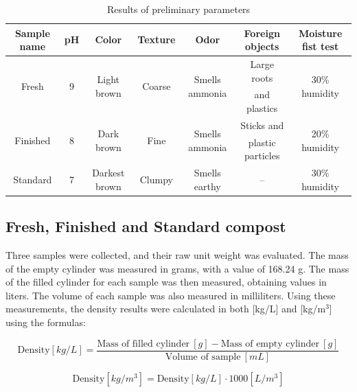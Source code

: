 \documentclass{article}
\begin{document}
\renewcommand{\arraystretch}{1.5}
\begin{table}[ht!]
    \centering \vspace{.3cm}
    \caption{Results of preliminary parameters}
    \hspace*{-.3cm}
    \begin{tabular}{|c|c|c|c|c|c|c|}
        \hline
        \textbf{Sample name} & \textbf{pH} & \textbf{Color} & \textbf{Texture} & \textbf{Odor} & \textbf{Foreign objects} & \textbf{Moisture fist test}\\
        \hline
        \multirow{2}{*}{Fresh} & \multirow{2}{*}{9} & \multirow{2}{*}{Light brown} & \multirow{2}{*}{Coarse} & \multirow{2}{*}{Smells ammonia} & Large roots & \multirow{2}{*}{30\% humidity} \\
        & & & & & and plastics & \\
        \hline                                                                  
        \multirow{2}{*}{Finished} & \multirow{2}{*}{8} & \multirow{2}{*}{Dark brown} & \multirow{2}{*}{Fine} & \multirow{2}{*}{Smells ammonia} & Sticks and & \multirow{2}{*}{20\% humidity} \\
        & & & & & plastic particles & \\
        \hline
        Standard & 7 & Darkest brown & Clumpy & Smells earthy & -- & 30\% humidity\\
        \hline
    \end{tabular}
\end{table}
\phantom{} \vspace*{-.2cm}

\subsection{Fresh, Finished and Standard compost}
Three samples were collected, and their raw unit weight was evaluated.
The mass of the empty cylinder was measured in grams, with a value of
168.24 g. The mass of the filled cylinder for each sample was then
measured, obtaining values in liters. The volume of each sample was
also measured in milliliters. Using these measurements, the density
results were calculated in both [kg/L] and [kg/m$^3$] using the formulas:

\[\text{Density} \left[kg/L\right] = \frac{\text{Mass of filled cylinder}\ [g] - \text{Mass of empty cylinder}\ [g]}{\text{Volume of sample}\ [mL]}\]

\[\text{Density} \left[kg/m^3\right] = \text{Density} \left[kg/L\right] \cdot 1000 \left[L/m^3\right]\]
\end{document}
